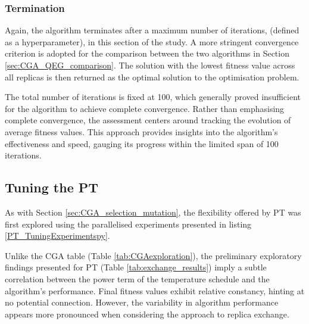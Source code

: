 \documentclass[10pt]{article}
\begin{document}
\begin{multicols}{2}
\subsubsection{Termination}

Again, the algorithm terminates after a maximum number of iterations, (defined as a hyperparameter), in this section of the study. A more stringent convergence criterion is adopted for the comparison between the two algorithms in Section \ref{sec:CGA_QEG_comparison}. The solution with the lowest fitness value across all replicas is then returned as the optimal solution to the optimisation problem.

The total number of iterations is fixed at 100, which generally proved insufficient for the algorithm to achieve complete convergence. Rather than emphasising complete convergence, the assessment centers around tracking the evolution of average fitness values. This approach provides insights into the algorithm's effectiveness and speed, gauging its progress within the limited span of 100 iterations.

\subsection{Tuning the PT}
\label{sec:PTtuning}

As with Section \ref{sec:CGA_selection_mutation}, the flexibility offered by PT was first explored using the parallelised experiments presented in listing \ref{PT_TuningExperimentspy}.

Unlike the CGA table (Table \ref{tab:CGAexploration}), the preliminary exploratory findings presented for PT (Table \ref{tab:exchange_results}) imply a subtle correlation between the power term of the temperature schedule and the algorithm's performance. Final fitness values exhibit relative constancy, hinting at no potential connection. However, the variability in algorithm performance appears more pronounced when considering the approach to replica exchange.


\end{multicols}
\end{document}
